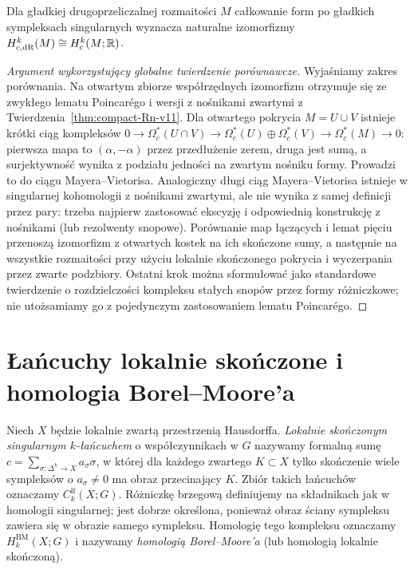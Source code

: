 \begin{twierdzenie}
\label{thm:compact-deRham-v11}
Dla gładkiej drugoprzeliczalnej rozmaitości $M$ całkowanie
form po gładkich sympleksach singularnych wyznacza
naturalne izomorfizmy
$H_{c,\mathrm{dR}}^k(M)\cong H_c^k(M;\mathbb{R})$.
\end{twierdzenie}
\begin{proof}[Argument wykorzystujący globalne twierdzenie porównawcze]
Wyjaśniamy zakres porównania. Na otwartym zbiorze
współrzędnych izomorfizm otrzymuje się ze zwykłego
lematu Poincarégo i wersji z nośnikami zwartymi
z Twierdzenia~\ref{thm:compact-Rn-v11}.
Dla otwartego pokrycia $M=U\cup V$ istnieje krótki ciąg
kompleksów
$0\to\Omega_c^*(U\cap V)\to
\Omega_c^*(U)\oplus\Omega_c^*(V)\to
\Omega_c^*(M)\to0$:
pierwsza mapa to $(\alpha,-\alpha)$ przez przedłużenie
zerem, druga jest sumą, a surjektywność wynika z podziału
jedności na zwartym nośniku formy. Prowadzi to do ciągu
Mayera--Vietorisa. Analogiczny długi ciąg Mayera--Vietorisa istnieje
w singularnej kohomologii z nośnikami zwartymi,
ale nie wynika z samej definicji przez pary:
trzeba najpierw zastosować ekscyzję i odpowiednią
konstrukcję z nośnikami (lub rezolwenty snopowe).
Porównanie map łączących i lemat pięciu przenoszą
izomorfizm z otwartych kostek na ich skończone sumy,
a następnie na wszystkie rozmaitości przy użyciu
lokalnie skończonego pokrycia i wyczerpania przez
zwarte podzbiory. Ostatni krok można sformułować jako
standardowe twierdzenie o rozdzielczości kompleksu
stałych snopów przez formy różniczkowe; nie utożsamiamy
go z pojedynczym zastosowaniem lematu Poincarégo.
\end{proof}

\section{Łańcuchy lokalnie skończone i homologia Borel--Moore'a}
\begin{definicja}
\label{def:BM-chain-v11}
Niech $X$ będzie lokalnie zwartą przestrzenią Hausdorffa.
\emph{Lokalnie skończonym singularnym $k$-łańcuchem}
o współczynnikach w $G$ nazywamy formalną sumę
$c=\sum_{\sigma:\Delta^k\to X}a_\sigma\sigma$,
w której dla każdego zwartego $K\subset X$ tylko
skończenie wiele sympleksów o $a_\sigma\ne0$
ma obraz przecinający $K$. Zbiór takich łańcuchów
oznaczamy $C_k^{\mathrm{lf}}(X;G)$.
Różniczkę brzegową definiujemy na składnikach jak
w homologii singularnej; jest dobrze określona,
ponieważ obraz ściany sympleksu zawiera się w obrazie
samego sympleksu. Homologię tego kompleksu oznaczamy
$H_k^{\mathrm{BM}}(X;G)$ i nazywamy
\emph{homologią Borel--Moore'a} (lub homologią lokalnie skończoną).
\end{definicja}


